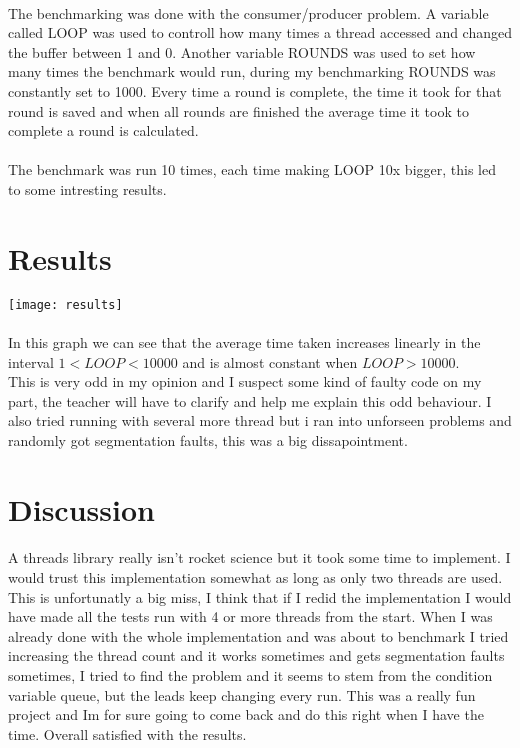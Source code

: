 \documentclass[11pt]{article}
\begin{document}
\paragraph{}
The benchmarking was done with the consumer/producer problem. A variable called LOOP was used to controll how many times a thread accessed and 
changed the buffer between 1 and 0. Another variable ROUNDS was used to set how many times the benchmark would run, during my benchmarking 
ROUNDS was constantly set to 1000. Every time a round is complete, the time it took for that round is saved and when all rounds are finished
the average time it took to complete a round is calculated.

\paragraph{}
The benchmark was run 10 times, each time making LOOP 10x bigger, this led to some intresting results.

\section{Results}

\texttt{[image: results]} \\

\paragraph{}
In this graph we can see that the average time taken increases linearly in the interval $1<LOOP<10000$ and is almost constant when $LOOP>10000$. \\
This is very odd in my opinion and I suspect some kind of faulty code on my part, the teacher will have to clarify and help me explain this odd behaviour.
I also tried running with several more thread but i ran into unforseen problems and randomly got segmentation faults, this was a big dissapointment.

\section{Discussion}

\paragraph{}
A threads library really isn't rocket science but it took some time to implement. I would trust this implementation somewhat as long as only two threads
are used. This is unfortunatly a big miss, I think that if I redid the implementation I would have made all the tests run with 4 or more threads from 
the start. When I was already done with the whole implementation and was about to benchmark I tried increasing the thread count and it works sometimes
and gets segmentation faults sometimes, I tried to find the problem and it seems to stem from the condition variable queue, but the leads keep changing 
every run. This was a really fun project and Im for sure going to come back and do this right when I have the time. Overall satisfied with the results.
\end{document}
